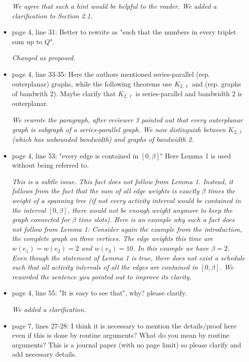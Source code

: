 \documentclass[11pt,a4paper]{article}
\begin{document}
\begin{itemize}
\textit{We agree that such a hint would be helpful to the reader. We added a clarification to Section 2.1.}

\item page 4, line 31: Better to rewrite as "such that the numbers in every triplet sum up to $Q$".

\textit{Changed as proposed.}

\item page 4, line 33-35: Here the authors mentioned series-parallel (rep. outerplanar) graphs, while the following theorems use $K_{2,\ell}$ and (rep. graphs of bandwith 2). Maybe clarify that $K_{2,\ell}$ is series-parallel and bandwidth 2 is outerplanar.

\textit{We rewrote the paragraph, after reviewer 3 pointed out that every outerplanar graph is subgraph of a series-parallel graph. We now distinguish between $K_{2,\ell}$ (which has unbounded bandwidth) and graphs of bandwidth 2.}

\item page 4, line 53: "every edge is contained in $[0, \beta]$" Here Lemma 1 is used without being referred to.

\textit{This is a subtle issue. This fact does not follow from Lemma 1. Instead, it follows from the fact that the sum of all edge weights is exactly $\beta$ times the weight of a spanning tree (if not every activity interval would be contained in the interval $[0, \beta]$, there would not be enough weight anymore to keep the graph connected for $\beta$ time slots). Here is an example why such a fact does not follow from Lemma 1: Consider again the example from the introduction, the complete graph on three vertices. The edge weights this time are $w(e_1) = w(e_2) = 2$ and $w(e_3) = 10$. In this example we have $\beta = 2$. Even though the statement of Lemma 1 is true, there does not exist a schedule such that all activity intervals of all the edges are contained in $[0, \beta]$. We reworded the sentence you pointed out to improve its clarity.}

\item page 4, line 55: "It is easy to see that", why? please clarify.

\textit{We added a clarification.}

\item page 7, lines 27-28: I think it is necessary to mention the details/proof here even if this is done by routine arguments? What do you mean by routine arguments? This is a journal paper (with no page limit) so please clarify and add necessary details.


\end{itemize}
\end{document}
